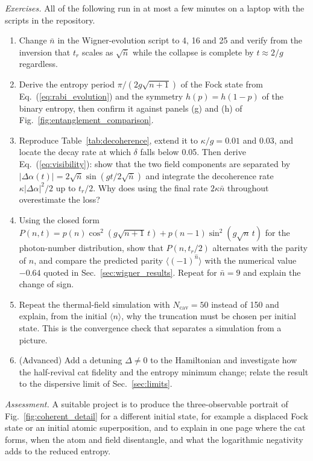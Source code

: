 \documentclass{iopjournal}
\begin{document}
\textit{Exercises.} All of the following run in at most a few minutes on a laptop with the scripts in the repository.
\begin{enumerate}
\item Change $\bar{n}$ in the Wigner-evolution script to 4, 16 and 25 and verify from the inversion that $t_r$ scales as $\sqrt{\bar{n}}$ while the collapse is complete by $t \approx 2/g$ regardless.
\item Derive the entropy period $\pi/(2g\sqrt{n+1})$ of the Fock state from Eq.~(\ref{eq:rabi_evolution}) and the symmetry $h(p) = h(1-p)$ of the binary entropy, then confirm it against panels (g) and (h) of Fig.~\ref{fig:entanglement_comparison}.
\item Reproduce Table~\ref{tab:decoherence}, extend it to $\kappa/g = 0.01$ and $0.03$, and locate the decay rate at which $\delta$ falls below 0.05. Then derive Eq.~(\ref{eq:visibility}): show that the two field components are separated by $|\Delta\alpha(t)| = 2\sqrt{\bar{n}}\sin(gt/2\sqrt{\bar{n}})$ and integrate the decoherence rate $\kappa|\Delta\alpha|^2/2$ up to $t_r/2$. Why does using the final rate $2\kappa\bar{n}$ throughout overestimate the loss?
\item Using the closed form $P(n,t) = p(n)\cos^2(g\sqrt{n+1}\,t) + p(n-1)\sin^2(g\sqrt{n}\,t)$ for the photon-number distribution, show that $P(n, t_r/2)$ alternates with the parity of $n$, and compare the predicted parity $\langle(-1)^{\hat{n}}\rangle$ with the numerical value $-0.64$ quoted in Sec.~\ref{sec:wigner_results}. Repeat for $\bar{n} = 9$ and explain the change of sign.
\item Repeat the thermal-field simulation with $N_{\text{cav}} = 50$ instead of 150 and explain, from the initial $\langle n\rangle$, why the truncation must be chosen per initial state. This is the convergence check that separates a simulation from a picture.
\item (Advanced) Add a detuning $\Delta \neq 0$ to the Hamiltonian and investigate how the half-revival cat fidelity and the entropy minimum change; relate the result to the dispersive limit of Sec.~\ref{sec:limits}.
\end{enumerate}

\textit{Assessment.} A suitable project is to produce the three-observable portrait of Fig.~\ref{fig:coherent_detail} for a different initial state, for example a displaced Fock state or an initial atomic superposition, and to explain in one page where the cat forms, when the atom and field disentangle, and what the logarithmic negativity adds to the reduced entropy.
\end{document}
